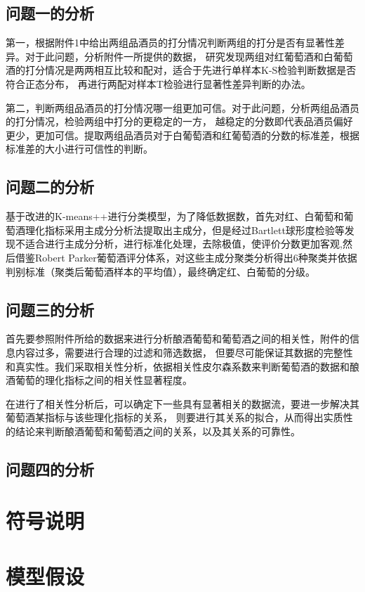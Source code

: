 \documentclass[UTF8]{ctexart}
\begin{document}
\subsection{问题一的分析}
第一，根据附件1中给出两组品酒员的打分情况判断两组的打分是否有显著性差异。对于此问题，分析附件一所提供的数据，
研究发现两组对红葡萄酒和白葡萄酒的打分情况是两两相互比较和配对，适合于先进行单样本K-S检验判断数据是否符合正态分布，
再进行两配对样本T检验进行显著性差异判断的办法。

第二，判断两组品酒员的打分情况哪一组更加可信。对于此问题，分析两组品酒员的打分情况，检验两组中打分的更稳定的一方，
越稳定的分数即代表品酒员偏好更少，更加可信。提取两组品酒员对于白葡萄酒和红葡萄酒的分数的标准差，根据标准差的大小进行可信性的判断。

\subsection{问题二的分析}
基于改进的K-means++\cite{arthur2006k}进行分类模型，为了降低数据数，首先对红、白葡萄和葡萄酒理化指标采用主成分分析法提取出主成分，但是经过Bartlett球形度检验\cite{arsham2011bartlett}等发现不适合进行主成分分析，进行标准化处理，去除极值，使评价分数更加客观,然后借鉴Robert Parker葡萄酒评分体系\cite{hommerberg2011persuasiveness}，对这些主成分聚类分析得出6种聚类并依据判别标准（聚类后葡萄酒样本的平均值），最终确定红、白葡萄的分级。

\subsection{问题三的分析}
首先要参照附件所给的数据来进行分析酿酒葡萄和葡萄酒之间的相关性，附件的信息内容过多，需要进行合理的过滤和筛选数据，
但要尽可能保证其数据的完整性和真实性。我们采取相关性分析，依据相关性皮尔森系数来判断葡萄酒的数据和酿酒葡萄的理化指标之间的相关性显著程度。

在进行了相关性分析后，可以确定下一些具有显著相关的数据流，要进一步解决其葡萄酒某指标与该些理化指标的关系，
则要进行其关系的拟合，从而得出实质性的结论来判断酿酒葡萄和葡萄酒之间的关系，以及其关系的可靠性。
\subsection{问题四的分析}


\section{符号说明}

\section{模型假设}
\end{document}
